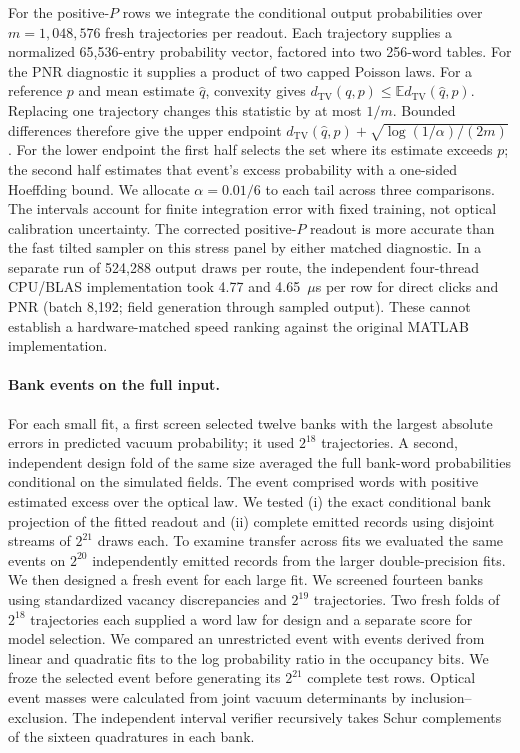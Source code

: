 \documentclass[11pt]{article}
\newcommand{\TV}{d_{\mathrm{TV}}}
\newcommand{\E}{\mathbb{E}}
\begin{document}
For the positive-$P$ rows we integrate the conditional output probabilities over $m=1,048,576$ fresh trajectories per readout. Each trajectory supplies a normalized 65,536-entry probability vector, factored into two 256-word tables. For the PNR diagnostic it supplies a product of two capped Poisson laws. For a reference $p$ and mean estimate $\hat q$, convexity gives $\TV(q,p)\le\E\TV(\hat q,p)$. Replacing one trajectory changes this statistic by at most $1/m$. Bounded differences therefore give the upper endpoint $\TV(\hat q,p)+\sqrt{\log(1/\alpha)/(2m)}$. For the lower endpoint the first half selects the set where its estimate exceeds $p$; the second half estimates that event's excess probability with a one-sided Hoeffding bound. We allocate $\alpha=0.01/6$ to each tail across three comparisons. The intervals account for finite integration error with fixed training, not optical calibration uncertainty. The corrected positive-$P$ readout is more accurate than the fast tilted sampler on this stress panel by either matched diagnostic. In a separate run of 524,288 output draws per route, the independent four-thread CPU/BLAS implementation took 4.77 and 4.65~$\mu$s per row for direct clicks and PNR (batch 8,192; field generation through sampled output). These cannot establish a hardware-matched speed ranking against the original MATLAB implementation.


\paragraph{Bank events on the full input.}
For each small fit, a first screen selected twelve banks with the largest absolute errors in predicted vacuum probability; it used $2^{18}$ trajectories. A second, independent design fold of the same size averaged the full bank-word probabilities conditional on the simulated fields. The event comprised words with positive estimated excess over the optical law. We tested (i) the exact conditional bank projection of the fitted readout and (ii) complete emitted records using disjoint streams of $2^{21}$ draws each. To examine transfer across fits we evaluated the same events on $2^{20}$ independently emitted records from the larger double-precision fits. We then designed a fresh event for each large fit. We screened fourteen banks using standardized vacancy discrepancies and $2^{19}$ trajectories. Two fresh folds of $2^{18}$ trajectories each supplied a word law for design and a separate score for model selection. We compared an unrestricted event with events derived from linear and quadratic fits to the log probability ratio in the occupancy bits. We froze the selected event before generating its $2^{21}$ complete test rows. Optical event masses were calculated from joint vacuum determinants by inclusion--exclusion. The independent interval verifier recursively takes Schur complements of the sixteen quadratures in each bank.
\end{document}
